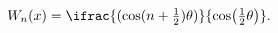 \[\mathop{W_{n}\/}\nolimits\!\left(x\right)=\ifrac{(\mathop{\cos\/}\nolimits(n+%
\tfrac{1}{2})\theta)}{\mathop{\cos\/}\nolimits\!\left(\tfrac{1}{2}\theta\right%
)}.\]
